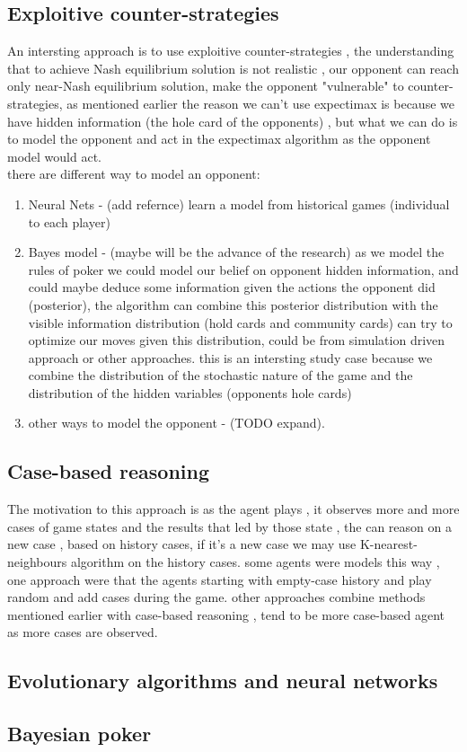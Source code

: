 \documentclass{article}
\begin{document}
\subsection{Exploitive counter-strategies}
An intersting approach is to use exploitive counter-strategies , the understanding that to achieve Nash equilibrium solution is not realistic , our opponent can reach only near-Nash equilibrium solution, make the opponent "vulnerable" to counter-strategies, as mentioned earlier the reason we can't use expectimax is because we have hidden information (the hole card of the opponents) , but what we can do is to model the opponent and act in the expectimax algorithm as the opponent model would act.\\
there are different way to model an opponent: \\
\begin{enumerate}
\item Neural Nets - (add refernce) learn a model from historical games (individual to each player) \\
\item Bayes model - (maybe will be the advance of the research) as we model the rules of poker we could model our belief on opponent hidden information, and could maybe deduce some information given the actions the opponent did (posterior), the algorithm can combine this posterior distribution with the visible information distribution (hold cards and community cards)  can try to optimize our moves given this distribution, could be from simulation driven approach or other approaches. this is an intersting study case because we combine the distribution of the stochastic nature of the game and the distribution of the hidden variables (opponents hole cards)\\
\item other ways to model the opponent - (TODO expand).
\end{enumerate}

\subsection{Case-based reasoning}
The motivation to this approach is as the agent plays , it observes more and more cases of game states and the results that led by those state , the can reason on a new case , based on history cases, if it's a new case we may use K-nearest-neighbours algorithm on the history cases. 
some agents were models this way , one approach were that the agents starting with empty-case history and play random and add cases during the game. other approaches combine 
methods mentioned earlier with case-based reasoning , tend to be more case-based agent as more cases are observed. 
\subsection{Evolutionary algorithms and neural networks}

\subsection{Bayesian poker}
\end{document}
